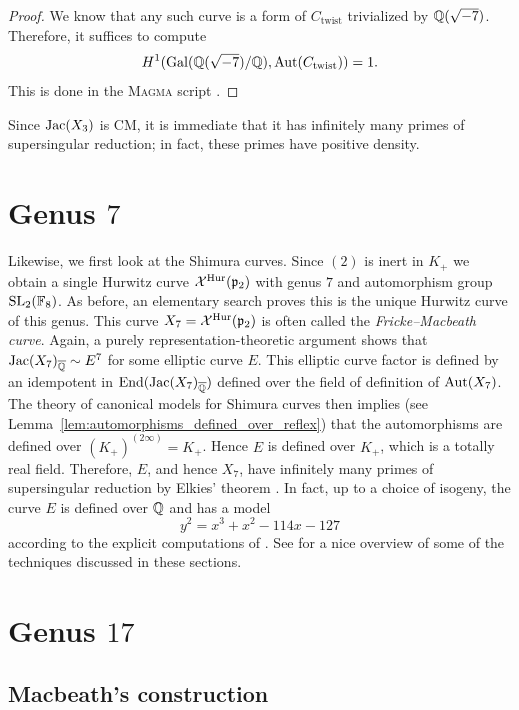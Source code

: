 \documentclass[main.tex]{subfiles}
\begin{document}
\begin{proof}
We know that any such curve is a form of $C_{\mathrm{twist}}$ trivialized by $\mathbb{Q}(\sqrt{-7})$. Therefore, it suffices to compute
\[ H^1(\operatorname{\mathrm{Gal}}(\mathbb{Q}(\sqrt{-7})/\mathbb{Q}), \operatorname{\mathrm{Aut}}(C_{\mathrm{twist}})) = 1. \]
This is done in the \textsc{Magma} script \cite[\texttt{H1\_crossed\_homs.m}]{church:github}.
\end{proof}

Since $\operatorname{\mathrm{Jac}}(X_3)$ is CM, it is immediate that it has infinitely many primes of supersingular reduction; in fact, these primes have positive density.

\section{Genus $7$} \label{sec:genus7}

Likewise, we first look at the Shimura curves. Since $(2)$ is inert in $K_+$ we obtain a single Hurwitz curve $\mathcal{X}^{\mathrm{Hur}}(\mathfrak{p}_{2})$ with genus $7$ and automorphism group $\mathrm{SL}_2(\mathbb{F}_8)$. As before, an elementary search proves this is the unique Hurwitz curve of this genus. This curve $X_7 = \mathcal{X}^{\mathrm{Hur}}(\mathfrak{p}_{2})$ is often called the \textit{Fricke--Macbeath curve}. Again, a purely representation-theoretic argument shows that $\operatorname{\mathrm{Jac}}(X_7)_{\overline{\mathbb{Q}}} \sim E^7$ for some elliptic curve $E$. This elliptic curve factor is defined by an idempotent in $\operatorname{\mathrm{End}}(\operatorname{\mathrm{Jac}}(X_7)_{\overline{\mathbb{Q}}})$ defined over the field of definition of $\operatorname{\mathrm{Aut}}(X_7)$. The theory of canonical models for Shimura curves then implies (see Lemma~\ref{lem:automorphisms_defined_over_reflex}) that the automorphisms are defined over $(K_+)^{(2 \infty)} = K_+$. Hence $E$ is defined over $K_+$, which is a totally real field. Therefore, $E$, and hence $X_7$, have infinitely many primes of supersingular reduction by Elkies' theorem \cite{elkies:supersingular}. In fact, up to a choice of isogeny, the curve $E$ is defined over $\mathbb{Q}$ and has a model
\[ y^2 = x^3 + x^2 - 114 x - 127 \]
according to the explicit computations of \cite[Theorem~3]{top:counting_points_on_fricke_macbeath}. See \cite{wolfart:CM_jacobians} for a nice overview of some of the techniques discussed in these sections. 


\section{Genus $17$} \label{sec:genus17}

\subsection{Macbeath's construction}
\end{document}
